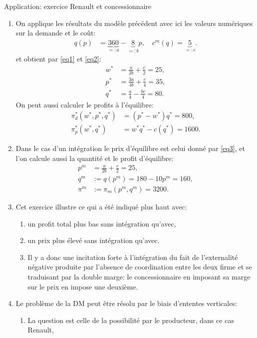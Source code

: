 \begin{frame}[allowframebreaks]{Application: exercice Renault et concessionnaire}
\begin{enumerate}
\item On applique les résultats du modèle précédent avec ici les valeurs numériques 
sur la demande et le coût:
\begin{align*}
    q(p) &= \underbrace{360}_{=:a} - \underbrace{8}_{=:b}p, \quad c^m(q) = \underbrace{5}_{=:c}.
\end{align*}
et obtient par \eqref{eq1} et \eqref{eq2}:
\begin{align*}
    w^* &= \frac{a}{2b} + \frac{c}{2} = 25,\\
    p^* &=  \frac{3a}{4b} +\frac{c}{4} = 35,\\
    q^* &= \frac{a}{4} - \frac{bc}{4} = 80.
\end{align*}
On peut aussi calculer le profits à l'équilibre: 
\begin{align*}
\pi_d^*(w^*, p^*, q^*) &= (p^* - w^*) q^* = 800,\\
\pi_p^*(w^*, q^*) &= w^*q^* - c(q^*) = 1600.
\end{align*}
\item Dans le cas d'un intégration le prix d'équilibre est celui donné par \eqref{eq3}, et l'on calcule aussi la 
quantité et le profit d'équilibre:
\begin{align*}
p^m &=  \frac{a}{2b} + \frac{c}{2} = 25,\\
q^m &:=q(p^m) = 180 - 10p^m = 160,\\
\pi^m &:= \pi_m(p^m, q^m)= 3200.
\end{align*}
\item Cet exercice illustre ce qui a été indiqué plus haut avec: 
\begin{enumerate}[$\star$]
\item un profit total plus bas sans intégration qu'avec,
\item un prix plus élevé sans intégration qu'avec.
\item Il y a donc une incitation forte à l'intégration du fait de l'externalité 
négative produite par l'absence de coordination entre les deux firme et se traduisant 
par la double marge: le concessionnaire en imposant sa marge sur le prix en impose une deuxième. 
\end{enumerate}
\item Le problème de la DM peut être résolu par le biais d'ententes verticales:
\begin{enumerate}[$\star$]
    \item La question est celle de la possibilité par le producteur, dans ce cas Renault, 

\end{enumerate}
\end{enumerate}
\end{frame}
